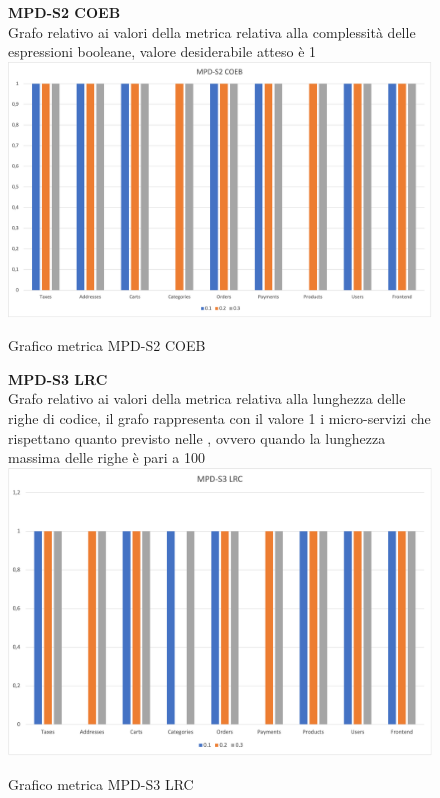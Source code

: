 \begin{center}
    \begin{figure}[!htb]
        \centering
        \textbf{MPD-S2 COEB} \\
        Grafo relativo ai valori della metrica relativa alla complessità delle espressioni booleane, valore desiderabile atteso è 1
        \includegraphics[scale=0.60]{res/images/RQcoeb.png}
        \caption{Grafico metrica MPD-S2 COEB}
    \end{figure}
    \begin{center}
        
    \end{center}

    \begin{figure}[!htb]
        \centering
        \textbf{MPD-S3 LRC} \\
        Grafo relativo ai valori della metrica relativa alla lunghezza delle righe di codice, il grafo rappresenta con il valore 1 i micro-servizi
        che rispettano quanto previsto nelle , ovvero quando la lunghezza massima delle righe è pari a 100 
        \includegraphics[scale=0.60]{res/images/RQlrc.png}
        \caption{Grafico metrica MPD-S3 LRC}
    \end{figure}
    \begin{center}
        

\end{center}
\end{center}

